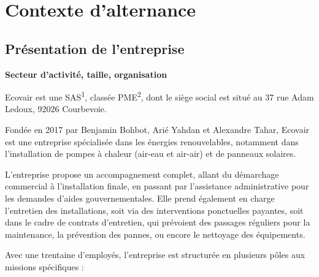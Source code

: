 

\section{Contexte d’alternance}
\label{context}

\subsection{Présentation de l’entreprise}

\textbf{Secteur d’activité, taille, organisation}\vspace{0.3cm}

Ecovair est une SAS\textsuperscript{1}, classée PME\textsuperscript{2}, dont le siège social est situé au 37 rue Adam Ledoux, 92026 Courbevoie.

Fondée en 2017 par Benjamin Bohbot, Arié Yahdan et Alexandre Tahar, Ecovair est une entreprise spécialisée dans les énergies renouvelables, notamment dans l'installation de pompes à chaleur (air-eau et air-air) et de panneaux solaires.

L’entreprise propose un accompagnement complet, allant du démarchage commercial à l’installation finale, en passant par l’assistance administrative pour les demandes d’aides gouvernementales. Elle prend également en charge l’entretien des installations, soit via des interventions ponctuelles payantes, soit dans le cadre de contrats d’entretien, qui prévoient des passages réguliers pour la maintenance, la prévention des pannes, ou encore le nettoyage des équipements.

Avec une trentaine d’employés, l’entreprise est structurée en plusieurs pôles aux missions spécifiques :\vspace{0.3cm}


